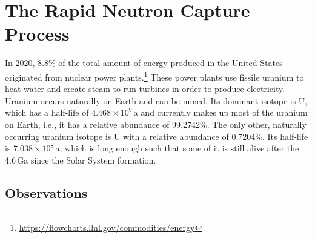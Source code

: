 
\chapter{The Rapid Neutron Capture Process}

In 2020, 8.8\% of the total amount of energy produced in the United States originated from nuclear power plants.\footnote{\url{https://flowcharts.llnl.gov/commodities/energy}} These power plants use fissile uranium to heat water and create steam to run turbines in order to produce electricity. Uranium occurs naturally on Earth and can be mined. Its dominant isotope is U, which has a half-life of $4.468\times10^9$\,a and currently makes up most of the uranium on Earth, i.e., it has a relative abundance of 99.2742\%. The only other, naturally occurring uranium isotope is U with a relative abundance of 0.7204\%. Its half-life is $7.038\times10^8$\,a, which is long enough such that some of it is still alive after the 4.6\,Ga since the Solar System formation.

\section{Observations}\label{sec:r-process:observations}

